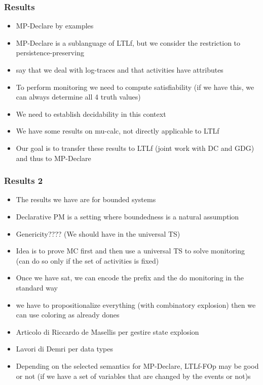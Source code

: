 \documentclass{beamer}
\begin{document}

\begin{frame}
\frametitle{Results}

\begin{itemize}
	\item MP-Declare by examples
	\item MP-Declare is a sublanguage of LTLf, but we consider the restriction to persistence-preserving
	\item say that we deal with log-traces and that activities have attributes
	\item To perform monitoring we need to compute satisfiability (if we have this, we can always determine all 4 truth values)
	\item We need to establish decidability in this context
	\item We have some results on mu-calc, not directly applicable to LTLf
	\item Our goal is to transfer these results to LTLf (joint work with DC and GDG) 
		and thus to MP-Declare
\end{itemize}

\end{frame}


\begin{frame}
\frametitle{Results 2}

\begin{itemize}
	\item The results we have are for bounded systems
	\item Declarative PM is a setting where boundedness is a natural assumption
	\item Genericity???? (We should have in the universal TS)
	\item Idea is to prove MC first and then use a universal TS to solve monitoring
		(can do so only if the set of activities is fixed)
	\item Once we have sat, we can encode the prefix and the do monitoring in the standard way
	\item we have to propositionalize everything (with combinatory explosion) then we can use coloring as 
	already dones
	\item Articolo di Riccardo de Masellis per gestire state explosion
	\item Lavori di Demri per data types
	\item Depending on the selected semantics for MP-Declare, LTLf-FOp may be 
		good or not (if we have a set of variables that are changed by the events or not)s
\end{itemize}

\end{frame}

\end{document}
